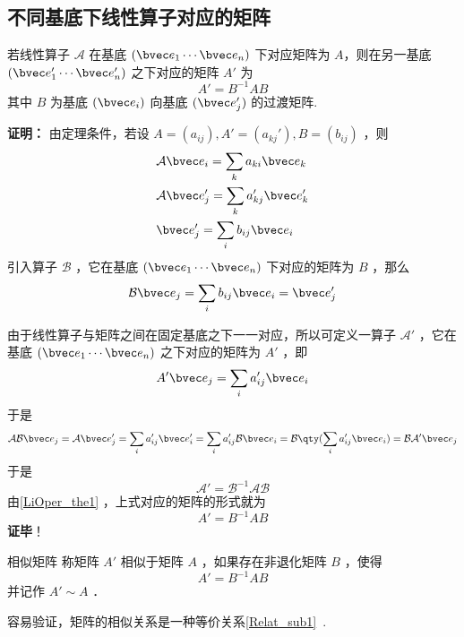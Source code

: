 \subsection{不同基底下线性算子对应的矩阵}\label{LiOper_sub1}
\begin{theorem}{}\label{LiOper_the2}
若线性算子 $\mathcal A$ 在基底 $(\bvec e_1\cdots \bvec e_n)$ 下对应矩阵为 $A$，则在另一基底  $(\bvec e'_1\cdots \bvec e'_n)$ 之下对应的矩阵 $A'$ 为
\begin{equation}
A'=B^{-1}AB
\end{equation}
其中 $B$ 为基底 $(\bvec e_i)$ 向基底 $(\bvec e_j')$ 的过渡矩阵.
\end{theorem}
\textbf{证明：}
由定理条件，若设 $A=(a_{ij}), A'=(a_{kj}'),B=(b_{ij})$ ，则
\begin{equation}
\begin{aligned}
&\mathcal{A}\bvec e_i=\sum_{k} a_{ki}\bvec e_k
\\
&\mathcal{A}\bvec e_j'=\sum_{k} a'_{kj}\bvec e'_k\\
&\bvec e_j'=\sum_i b_{ij}\bvec e_i
\end{aligned}
\end{equation}
引入算子 $\mathcal{B}$ ，它在基底 $(\bvec e_1\cdots \bvec e_n)$ 下对应的矩阵为 $B$ ，那么
\begin{equation}
\mathcal{B}\bvec e_j=\sum_i b_{ij}\bvec e_i=\bvec e_j'
\end{equation}

由于线性算子与矩阵之间在固定基底之下一一对应，所以可定义一算子 $\mathcal{A'}$ ，它在基底 $(\bvec e_1\cdots \bvec e_n)$ 之下对应的矩阵为 $A'$ ，即
\begin{equation}
A'\bvec e_j=\sum_i a'_{ij}\bvec e_i
\end{equation}
于是
\begin{equation}
\mathcal{AB}\bvec e_j=\mathcal{A}\bvec e'_j=\sum_i a'_{ij} \bvec e'_i=\sum_i a'_{ij}\mathcal{B}\bvec e_i=\mathcal{B}\qty(\sum_i a'_{ij}\bvec e_i)=\mathcal{BA'}\bvec e_j
\end{equation}
于是 
\begin{equation}
\mathcal{A'}=\mathcal{B}^{-1}\mathcal{AB}
\end{equation}
由\autoref{LiOper_the1} ，上式对应的矩阵的形式就为
\begin{equation}
A'=B^{-1}AB
\end{equation}
\textbf{证毕}！
\begin{definition}{相似矩阵}
称矩阵 $A'$ 相似于矩阵 $A$ ，如果存在非退化矩阵 $B$ ，使得
\begin{equation}
A'=B^{-1}AB
\end{equation}
并记作 $A'\sim A$ ．
\end{definition}
容易验证，矩阵的相似关系是一种等价关系\autoref{Relat_sub1}~.

